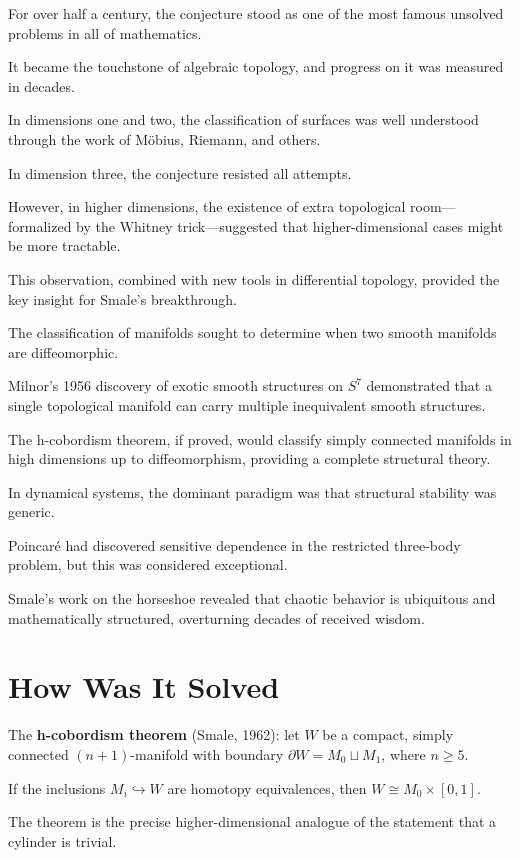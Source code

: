 For over half a century, the conjecture stood as one of the most famous unsolved problems in all of mathematics.

It became the touchstone of algebraic topology, and progress on it was measured in decades.

In dimensions one and two, the classification of surfaces was well understood through the work of Möbius, Riemann, and others.

In dimension three, the conjecture resisted all attempts.

However, in higher dimensions, the existence of extra topological room---formalized by the Whitney trick---suggested that higher-dimensional cases might be more tractable.

This observation, combined with new tools in differential topology, provided the key insight for Smale's breakthrough.

The classification of manifolds sought to determine when two smooth manifolds are diffeomorphic.

Milnor's 1956 discovery of exotic smooth structures on $S^7$ demonstrated that a single topological manifold can carry multiple inequivalent smooth structures.

The h-cobordism theorem, if proved, would classify simply connected manifolds in high dimensions up to diffeomorphism, providing a complete structural theory.

In dynamical systems, the dominant paradigm was that structural stability was generic.

Poincaré had discovered sensitive dependence in the restricted three-body problem, but this was considered exceptional.

Smale's work on the horseshoe revealed that chaotic behavior is ubiquitous and mathematically structured, overturning decades of received wisdom.

\section{How Was It Solved}

The \textbf{h-cobordism theorem} (Smale, 1962): let $W$ be a compact, simply connected $(n+1)$-manifold with boundary $\partial W = M_0 \sqcup M_1$, where $n \geq 5$.

If the inclusions $M_i \hookrightarrow W$ are homotopy equivalences, then $W \cong M_0 \times [0,1]$.

The theorem is the precise higher-dimensional analogue of the statement that a cylinder is trivial.

